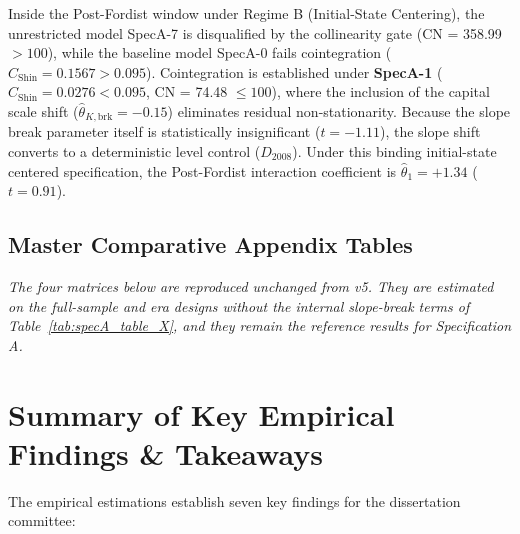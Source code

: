 \documentclass[11pt,a4paper]{article}
\begin{document}
Inside the Post-Fordist window under Regime B (Initial-State Centering), the unrestricted model SpecA-7 is disqualified by the collinearity gate (CN = 358.99 $> 100$), while the baseline model SpecA-0 fails cointegration ($C_{\text{Shin}} = 0.1567 > 0.095$). Cointegration is established under \textbf{SpecA-1} ($C_{\text{Shin}} = 0.0276 < 0.095$, CN = 74.48 $\le 100$), where the inclusion of the capital scale shift ($\hat{\theta}_{K,\text{brk}} = -0.15$) eliminates residual non-stationarity. Because the slope break parameter itself is statistically insignificant ($t = -1.11$), the slope shift converts to a deterministic level control ($D_{2008}$). Under this binding initial-state centered specification, the Post-Fordist interaction coefficient is $\hat{\theta}_1 = +1.34$ ($t = 0.91$).



\subsection{Master Comparative Appendix Tables}

\textit{The four matrices below are reproduced unchanged from v5. They are estimated on the full-sample and era designs without the internal slope-break terms of Table~\ref{tab:specA_table_X}, and they remain the reference results for Specification A.}









\FloatBarrier
\section{Summary of Key Empirical Findings \& Takeaways}

The empirical estimations establish seven key findings for the dissertation committee:
\end{document}
